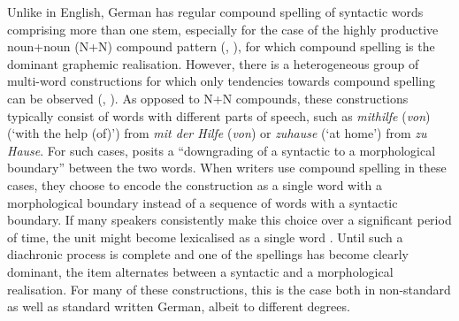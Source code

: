 \documentclass[biblatex, charis, linguex]{glossa}\usepackage{knitr}
\begin{document}
Unlike in English, German has regular compound spelling of syntactic words comprising more than one stem, especially for the case of the highly productive noun+noun (N+N) compound pattern (\citealt[182]{Fuhrhop2007}, \citealt[34]{Jacobs2005}), for which compound spelling is the dominant graphemic realisation.
However, there is a heterogeneous group of multi-word constructions for which only tendencies towards compound spelling can be observed (\citealt[95]{Szczepaniak2009}, \citealt[335]{Wurzel1998}).
As opposed to N+N compounds, these constructions typically consist of words with different parts of speech, such as \textit{mithilfe} (\textit{von}) (`with the help (of)') from \textit{mit der Hilfe} (\textit{von}) or \textit{zuhause} (`at home') from \textit{zu} \textit{Hause}.
For such cases, \citet[206]{Lehmann2020} posits a ``downgrading of a syntactic to a morphological boundary'' between the two words.
When writers use compound spelling in these cases, they choose to encode the construction as a single word with a morphological boundary instead of a sequence of words with a syntactic boundary.
If many speakers consistently make this choice over a significant period of time, the unit might become lexicalised  as a single word \parencite[212]{Lehmann2020}.
Until such a diachronic process is complete and one of the spellings has become clearly dominant, the item alternates between a syntactic and a morphological realisation.
For many of these constructions, this is the case both in non-standard as well as standard written German, albeit to different degrees.
\end{document}
